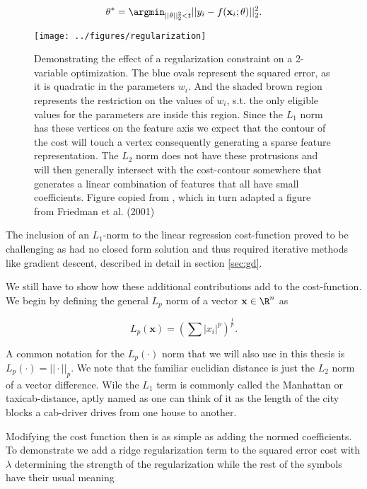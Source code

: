 \begin{align}
\theta^* = \argmin_{||\theta||_2^2<t} ||y_i - f(\mathbf{x}_i; \theta)||_2^2.
\end{align}

\begin{figure}
\centering
\texttt{[image: ../figures/regularization]}
\caption[Geometric interpretation of the $L_1$ and $L_2$ regularization and the squared error cost]{Demonstrating the effect of a regularization constraint on a 2-variable optimization. The blue ovals represent the squared error, as it is quadratic in the parameters $w_i$. And the shaded brown region represents the restriction on the values of $w_i$, s.t. the only eligible values for the parameters are inside this region. Since the $L_1$ norm has these vertices on the feature axis we expect that the contour of the cost will touch a vertex consequently generating a sparse feature representation. The $L_2$ norm does not have these protrusions and will then generally intersect with the cost-contour somewhere that generates a linear combination of features that all have small coefficients. Figure copied from \citet{Mehta2019}, which in turn adapted a figure from Friedman et al. (2001)}\label{fig:regularization}
\end{figure}

The inclusion of an $L_1$-norm to the linear regression cost-function proved to be challenging as had no closed form solution and thus required iterative methods like gradient descent, described in detail in section \ref{sec:gd}. 

We still have to show how these additional contributions add to the cost-function. We begin by defining the general $L_p$ norm of a vector $\mathbf{x} \in \R^n$ as

\begin{equation}
L_p(\mathbf{x}) = \left(\sum |x_i|^p\right)^{\frac{1}{p}}.
\end{equation}

\noindent A common notation for the $L_p(\cdot)$ norm that we will also use in this thesis is $L_p(\cdot) = ||\cdot||_p$. We note that the familiar euclidian distance is just the $L_2$ norm of a vector difference. Wile the $L_1$ term is commonly called the Manhattan or taxicab-distance, aptly named as one can think of it as the length of the city blocks a cab-driver drives from one house to another.

Modifying the cost function then is as simple as adding the normed coefficients. To demonstrate we add a ridge regularization term to the squared error cost with $\lambda$ determining the strength of the regularization while the rest of the symbols have their usual meaning

